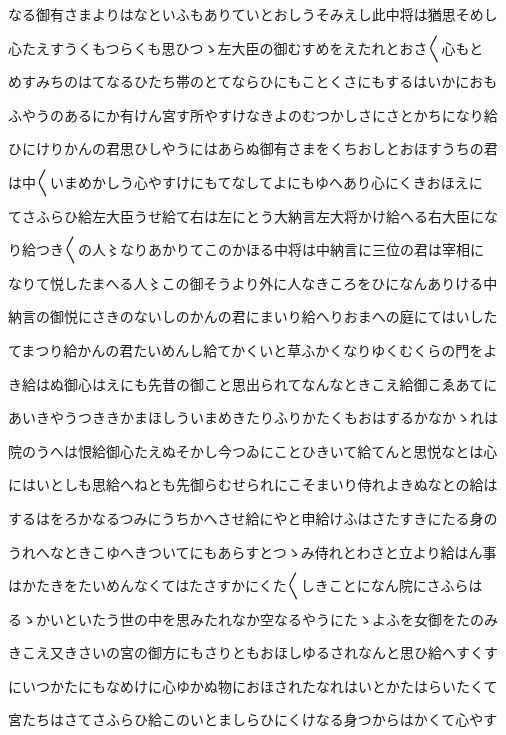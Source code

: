 \documentclass[a4paper,11pt,landscape]{ltjtarticle}
\begin{document}
なる御有さまよりはなといふもありていとおしうそみえし此中将は猶思そめし
\par\medskip
心たえすうくもつらくも思ひつゝ左大臣の御むすめをえたれとおさ〱心もと
\par\medskip
めすみちのはてなるひたち帯のとてならひにもことくさにもするはいかにおも
\par\medskip
ふやうのあるにか有けん宮す所やすけなきよのむつかしさにさとかちになり給
\par\medskip
ひにけりかんの君思ひしやうにはあらぬ御有さまをくちおしとおほすうちの君
\par\medskip
は中〱いまめかしう心やすけにもてなしてよにもゆへあり心にくきおほえに
\par\medskip
てさふらひ給左大臣うせ給て右は左にとう大納言左大将かけ給へる右大臣にな
\par\medskip
り給つき〱の人〻なりあかりてこのかほる中将は中納言に三位の君は宰相に
\par\medskip
なりて悦したまへる人〻この御そうより外に人なきころをひになんありける中
\par\medskip
納言の御悦にさきのないしのかんの君にまいり給へりおまへの庭にてはいした
\par\medskip
てまつり給かんの君たいめんし給てかくいと草ふかくなりゆくむくらの門をよ
\par\medskip
き給はぬ御心はえにも先昔の御こと思出られてなんなときこえ給御こゑあてに
\par\medskip
あいきやうつききかまほしういまめきたりふりかたくもおはするかなかゝれは
\par\medskip
院のうへは恨給御心たえぬそかし今つゐにことひきいて給てんと思悦なとは心
\par\medskip
にはいとしも思給へねとも先御らむせられにこそまいり侍れよきぬなとの給は
\par\medskip
するはをろかなるつみにうちかへさせ給にやと申給けふはさたすきにたる身の
\par\medskip
うれへなときこゆへきついてにもあらすとつゝみ侍れとわさと立より給はん事
\par\medskip
はかたきをたいめんなくてはたさすかにくた〱しきことになん院にさふらは
\par\medskip
るゝかいといたう世の中を思みたれなか空なるやうにたゝよふを女御をたのみ
\par\medskip
きこえ又きさいの宮の御方にもさりともおほしゆるされなんと思ひ給へすくす
\par\medskip
にいつかたにもなめけに心ゆかぬ物におほされたなれはいとかたはらいたくて
\par\medskip
宮たちはさてさふらひ給このいとましらひにくけなる身つからはかくて心やす
\end{document}
